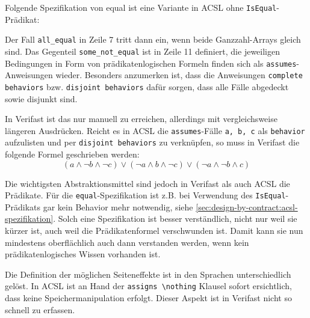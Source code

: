 Folgende Spezifikation von equal ist eine Variante in ACSL ohne \lstinline{IsEqual}-Prädikat:

\begin{figure}[H]
	
\end{figure}

Der Fall \lstinline{all_equal} in Zeile 7 tritt dann ein, wenn beide Ganzzahl-Arrays gleich sind. Das 
Gegenteil \lstinline{some_not_equal} ist in Zeile 11 definiert, die jeweiligen Bedingungen in Form von
prädikatenlogischen Formeln finden sich als \lstinline{assumes}-Anweisungen wieder. Besonders anzumerken ist,
dass die Anweisungen \lstinline{complete behaviors} bzw. \lstinline{disjoint behaviors} dafür sorgen, dass
alle Fälle abgedeckt sowie disjunkt sind.

In Verifast ist das nur manuell zu erreichen, allerdings mit vergleichsweise längeren Ausdrücken. Reicht 
es in ACSL die \lstinline{assumes}-Fälle \lstinline{a, b, c} als \lstinline{behavior} 
aufzulisten und per \lstinline{disjoint behaviors} zu verknüpfen, so muss in Verifast die folgende
Formel geschrieben werden:
\[(a \land \neg b \land \neg c) \lor (\neg a \land b \land \neg c) \lor (\neg a \land \neg b \land c)\]

Die wichtigsten Abstraktionsmittel sind jedoch in Verifast als auch ACSL die Prädikate. 
Für die \lstinline{equal}-Spezifikation ist z.B. bei Verwendung des \lstinline{IsEqual}-Prädikats gar kein Behavior mehr notwendig,
siehe \ref{sec:design-by-contract:acsl-spezifikation}. Solch eine Spezifikation ist besser 
verständlich, nicht nur weil sie kürzer ist, auch weil die Prädikatenformel verschwunden ist. 
Damit kann sie nun mindestens oberflächlich auch dann verstanden werden, wenn kein 
prädikatenlogisches Wissen vorhanden ist.

Die Definition der möglichen Seiteneffekte ist in den Sprachen unterschiedlich gelöst. In ACSL
ist an Hand der \lstinline{assigns \nothing} Klausel sofort ersichtlich, dass keine Speichermanipulation
erfolgt. Dieser Aspekt ist in Verifast nicht so schnell zu erfassen.

